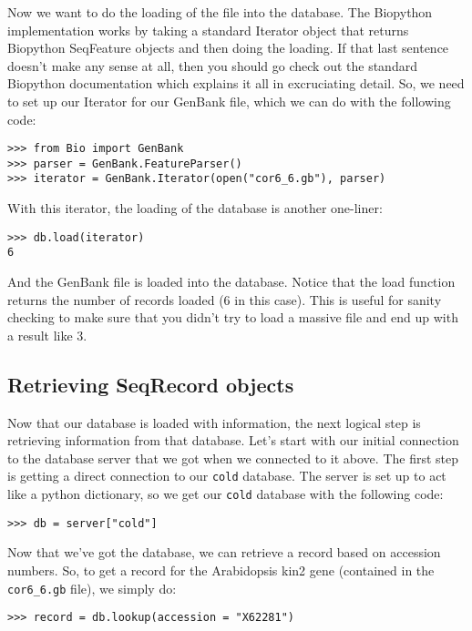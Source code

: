 \documentclass{article}
\begin{document}
Now we want to do the loading of the file into the database. The
Biopython implementation works by taking a standard Iterator object that
returns Biopython SeqFeature objects and then doing the loading. If that
last sentence doesn't make any sense at all, then you should go check
out the standard Biopython documentation which explains it all in
excruciating detail. So, we need to set up our Iterator for our GenBank
file, which we can do with the following code:

\begin{verbatim}
>>> from Bio import GenBank
>>> parser = GenBank.FeatureParser()
>>> iterator = GenBank.Iterator(open("cor6_6.gb"), parser)
\end{verbatim}

With this iterator, the loading of the database is another one-liner:

\begin{verbatim}
>>> db.load(iterator)
6
\end{verbatim}

And the GenBank file is loaded into the database. Notice that the load
function returns the number of records loaded (6 in this case). This is
useful for sanity checking to make sure that you didn't try to load a
massive file and end up with a result like 3.

\subsection{Retrieving SeqRecord objects}

Now that our database is loaded with information, the next logical step
is retrieving information from that database. Let's start with our
initial connection to the database server that we got when we connected
to it above. The first step is getting a direct connection to our
\verb|cold| database. The server is set up to act like a python
dictionary, so we get our \verb|cold| database with the following code:

\begin{verbatim}
>>> db = server["cold"]
\end{verbatim}

Now that we've got the database, we can retrieve a record based on
accession numbers. So, to get a record for the Arabidopsis kin2 gene
(contained in the \verb|cor6_6.gb| file), we simply do:

\begin{verbatim}
>>> record = db.lookup(accession = "X62281")
\end{verbatim}
\end{document}
